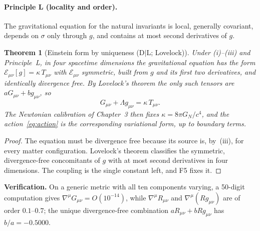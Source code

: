 \documentclass[11pt,a4paper]{article}
\newtheorem{theorem}{Theorem}[section]
\begin{document}
\paragraph{Principle L (locality and order).} The gravitational equation for the
natural invariants is local, generally covariant, depends on $\sigma$ only through
$g$, and contains at most second derivatives of $g$.

\begin{theorem}[Einstein form by uniqueness (D$\mid$L; Lovelock)]\label{thm:lovelock}
Under (i)--(iii) and Principle~L, in four spacetime dimensions the gravitational
equation has the form $\mathcal E_{\mu\nu}[g]=\kappa\,T_{\mu\nu}$ with
$\mathcal E_{\mu\nu}$ symmetric, built from $g$ and its first two derivatives, and
identically divergence free. By Lovelock's theorem \cite{Lovelock1971,Lovelock1972}
the only such tensors are $aG_{\mu\nu}+bg_{\mu\nu}$, so
\begin{equation}\label{eq:lovelock}
\boxed{G_{\mu\nu}+\Lambda g_{\mu\nu}=\kappa\,T_{\mu\nu}.}
\end{equation}
The Newtonian calibration of Chapter~3 then fixes $\kappa=8\pi G_N/c^4$, and the
action~\eqref{eq:action} is the corresponding variational form, up to boundary
terms.
\end{theorem}
\begin{proof}
The equation must be divergence free because its source is, by~(iii), for every
matter configuration. Lovelock's theorem classifies the symmetric, divergence-free
concomitants of $g$ with at most second derivatives in four dimensions. The
coupling is the single constant left, and F5 fixes it.
\end{proof}
\noindent\textbf{Verification.} On a generic metric with all ten components
varying, a 50-digit computation gives $\nabla^\mu G_{\mu\nu}=O(10^{-14})$, while
$\nabla^\mu R_{\mu\nu}$ and $\nabla^\mu(Rg_{\mu\nu})$ are of order $0.1$--$0.7$; the
unique divergence-free combination $aR_{\mu\nu}+bRg_{\mu\nu}$ has $b/a=-0.5000$.
\end{document}
